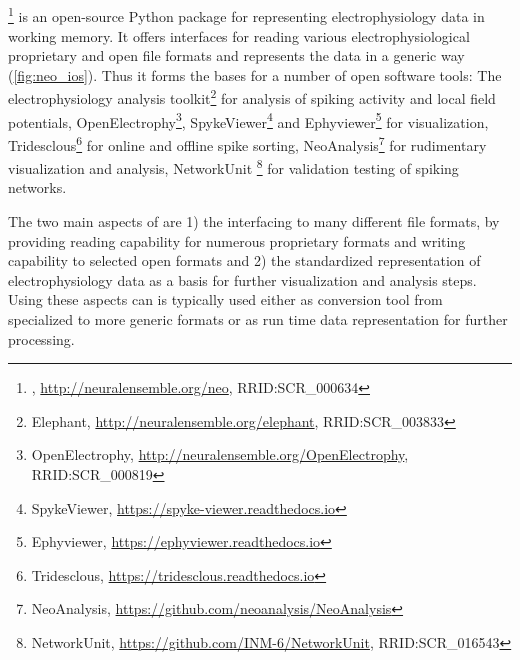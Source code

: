 




\subsection{}
\footnote{, \url{http://neuralensemble.org/neo}, RRID:SCR\_000634} \citep{garcia_neo:_2014-1} is an open-source Python package for representing electrophysiology data in working memory. It offers interfaces for reading various electrophysiological proprietary and open file formats and represents the data in a generic way (\cref{fig:neo_ios}). Thus it forms the bases for a number of open software tools: The electrophysiology analysis toolkit\footnote{Elephant, \url{http://neuralensemble.org/elephant}, RRID:SCR\_003833} for analysis of spiking activity and local field potentials, OpenElectrophy\footnote{OpenElectrophy, \url{http://neuralensemble.org/OpenElectrophy}, RRID:SCR\_000819}, SpykeViewer\footnote{SpykeViewer, \url{https://spyke-viewer.readthedocs.io}} and Ephyviewer\footnote{Ephyviewer, \url{https://ephyviewer.readthedocs.io}} for visualization, Tridesclous\footnote{Tridesclous, \url{https://tridesclous.readthedocs.io}} for online and offline spike sorting, NeoAnalysis\footnote{NeoAnalysis, \url{https://github.com/neoanalysis/NeoAnalysis}} \citep{zhang_neoanalysis:_2017} for rudimentary visualization and analysis, NetworkUnit \footnote{NetworkUnit, \url{https://github.com/INM-6/NetworkUnit}, RRID:SCR\_016543} for validation testing of spiking networks.

The two main aspects of  are 1) the interfacing to many different file formats, by providing reading capability for numerous proprietary formats and writing capability to selected open formats and 2) the standardized representation of electrophysiology data as a basis for further visualization and analysis steps. Using these aspects  can is typically used either as conversion tool from specialized to more generic formats or as run time data representation for further processing.

